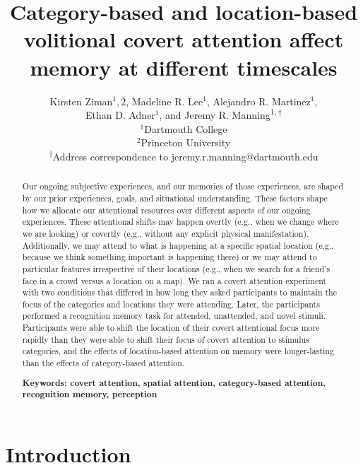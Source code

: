 \documentclass[english]{article}
\begin{document}
\title{Category-based and location-based volitional covert attention affect memory at different timescales}

\author{Kirsten Ziman$^1, 2$,
Madeline R. Lee$^1$,
Alejandro R. Martinez$^1$,\\
Ethan D. Adner$^1$,
and
Jeremy R. Manning\textsuperscript{$1, \dagger$}\\[0.1in]$^1$Dartmouth College\\
$^2$Princeton University\\
\textsuperscript{$\dagger$}Address correspondence to jeremy.r.manning@dartmouth.edu}

\maketitle

\begin{abstract} 
  
Our ongoing subjective experiences, and our memories of those experiences, are
shaped by our prior experiences, goals, and situational understanding. These
factors shape how we allocate our attentional resources over different aspects
of our ongoing experiences. These attentional shifts may happen overtly (e.g.,
when we change where we are looking) or covertly (e.g., without any explicit
physical manifestation). Additionally, we may attend to what is happening at a
specific spatial location (e.g., because we think something important is
happening there) or we may attend to particular features irrespective of their
locations (e.g., when we search for a friend's face in a crowd versus a
location on a map). We ran a covert attention experiment with two conditions
that differed in how long they asked participants to maintain the focus of the
categories and locations they were attending. Later, the participants performed
a recognition memory task for attended, unattended, and novel stimuli.
Participants were able to shift the location of their covert attentional focus
more rapidly than they were able to shift their focus of covert attention to
stimulus categories, and the effects of location-based attention on memory were
longer-lasting than the effects of category-based attention.

\noindent\textbf{Keywords: covert attention, spatial attention, category-based
attention, recognition memory, perception}

\end{abstract}


\section*{Introduction} 
\end{document}
